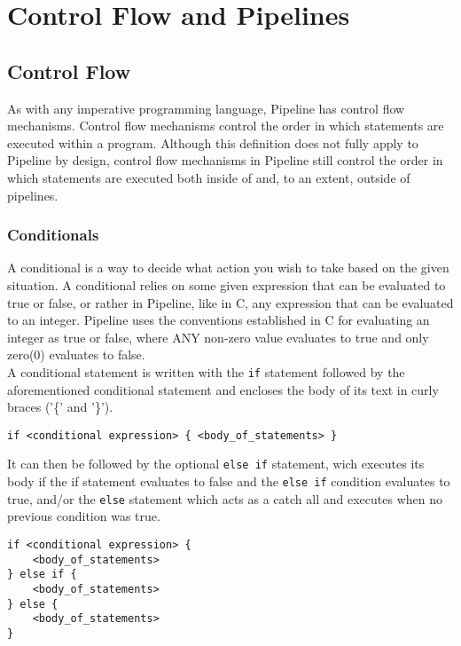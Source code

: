 \documentclass[./LRM_main.tex]{subfiles}
\begin{document}


\chapter{Control Flow and Pipelines}
\section{Control Flow}
As with any imperative programming language, Pipeline has control flow mechanisms. Control flow mechanisms control the order in which statements are executed within a program. Although this definition does not fully apply to Pipeline by design, control flow mechanisms in Pipeline still control the order in which statements are executed both inside of and, to an extent, outside of pipelines.
\subsection{Conditionals}
A conditional is a way to decide what action you wish to take based on the given situation. A conditional relies on some given expression that can be evaluated to true or false, or rather in Pipeline, like in C, any expression that can be evaluated to an integer. Pipeline uses the conventions established in C for evaluating an integer as true or false, where ANY non-zero value evaluates to true and only zero(0) evaluates to false.\\
A conditional statement is written with the \texttt{if} statement followed by the aforementioned conditional statement and encloses the body of its text in curly braces ('\{' and '\}').
\begin{lstlisting}
if <conditional expression> { <body_of_statements> }
\end{lstlisting}
It can then be followed by the optional \texttt{else if} statement, wich executes its body if the if statement evaluates to false and the \texttt{else if} condition evaluates to true, and/or the \texttt{else} statement which acts as a catch all and executes when no previous condition was true.
\begin{lstlisting}
if <conditional expression> {
	<body_of_statements>
} else if {
	<body_of_statements>
} else {
	<body_of_statements>
}
\end{lstlisting}
\end{document}
